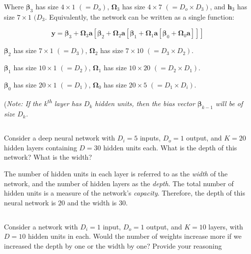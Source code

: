 \documentclass[12pt]{report}
\begin{document}
Where $\boldsymbol{\beta}_{3}$ has size $4 \times 1$ $(=D_{o})$, $\boldsymbol{\Omega}_{3}$ has size $4\times7$ $(=D_{o} \times D_{3})$, and $\mathbf{h}_{3}$ has size $7 \times 1$ $(D_{3}$. Equivalently, the network can be written as a single function:

\begin{equation*}
    \mathbf{y} = \boldsymbol{\beta}_{3} + \boldsymbol{\Omega}_{3}\mathbf{a}[\boldsymbol{\beta}_{2} + \boldsymbol{\Omega}_{2}\mathbf{a}[\boldsymbol{\beta}_{1} + \boldsymbol{\Omega}_{1}\mathbf{a}[\boldsymbol{\beta}_{0} + \boldsymbol{\Omega}_{0}\mathbf{a}]]]
\end{equation*}

$\boldsymbol{\beta}_{2}$ has size $7 \times 1$ $(=D_{3})$, $\boldsymbol{\Omega}_{2}$ has size $7 \times 10$ $(=D_{3} \times D_{2})$.

$\boldsymbol{\beta}_{1}$ has size $10 \times 1$ $(=D_{2})$, $\boldsymbol{\Omega}_{1}$ has size $10 \times 20$ $(=D_{2} \times D_{1})$.

$\boldsymbol{\beta}_{0}$ has size $20 \times 1$ $(=D_{1})$, $\boldsymbol{\Omega}_{0}$ has size $20 \times 5$ $(=D_{1} \times D_{i})$.

(\textit{Note: If the k\textsuperscript{th} layer has $D_{k}$ hidden units, then the bias vector $\boldsymbol{\beta}_{k-1}$ will be of size $D_{k}$.}

\subsection{}

\begin{mdframed}
    Consider a deep neural network with $D_{i} = 5$ inputs, $D_{o} = 1$ output, and $K = 20$ hidden layers containing $D = 30$ hidden units each. What is the depth of this network? What is the width?
\end{mdframed}

The number of hidden units in each layer is referred to as the \textit{width} of the network, and the number of hidden layers as the \textit{depth}. The total number of hidden units is a measure of the network’s \textit{capacity}. Therefore, the depth of this neural network is $20$ and the width is $30$.

\subsection{}
\begin{mdframed}
    Consider a network with $D_{i} = 1$ input, $D_{o} = 1$ output, and $K = 10$ layers, with $D = 10$ hidden units in each. Would the number of weights increase more if we increased the depth by one or the width by one? Provide your reasoning
\end{mdframed}
\end{document}
